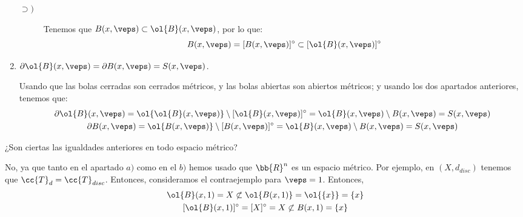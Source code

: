\begin{ejercicio}
\begin{enumerate}[label=\alph*)]
\begin{description}
            \item[$\supset)$] Tenemos que $B(x,\veps)\subset \ol{B}(x,\veps)$, por lo que:
            \begin{equation*}
                B(x,\veps)=[B(x,\veps)]^\circ \subset [\ol{B}(x,\veps)]^\circ
            \end{equation*}
        \end{description}
        
        \item $\partial \ol{B}(x,\veps) = \partial B(x,\veps) = S(x,\veps)$.

        Usando que las bolas cerradas son cerrados métricos, y las bolas abiertas son abiertos métricos; y usando los dos apartados anteriores, tenemos que:
        \begin{gather*}
            \partial \ol{B}(x,\veps) = \ol{\ol{B}(x,\veps)} \setminus [\ol{B}(x,\veps)]^\circ = \ol{B}(x,\veps)\setminus B(x,\veps)=S(x,\veps) \\
            \partial {B}(x,\veps) = \ol{{B}(x,\veps)} \setminus [{B}(x,\veps)]^\circ = \ol{B}(x,\veps)\setminus B(x,\veps)=S(x,\veps)
        \end{gather*}
        
    \end{enumerate}
    ¿Son ciertas las igualdades anteriores en todo espacio métrico?

    No, ya que tanto en el apartado $a)$  como en el $b)$ hemos usado que $\bb{R}^n$ es un espacio métrico. Por ejemplo, en $(X,d_{disc})$ tenemos que $\cc{T}_d=\cc{T}_{disc}$. Entonces, consideramos el contraejemplo para $\veps=1$. Entonces,
    \begin{gather*}
        \ol{B}(x,1)=X\not\subset \ol{B(x,1)}=\ol{\{x\}}=\{x\}\\
        [\ol{B}(x,1)]^\circ = [X]^\circ = X \not\subset B(x,1)=\{x\}
    \end{gather*}
\end{ejercicio}

